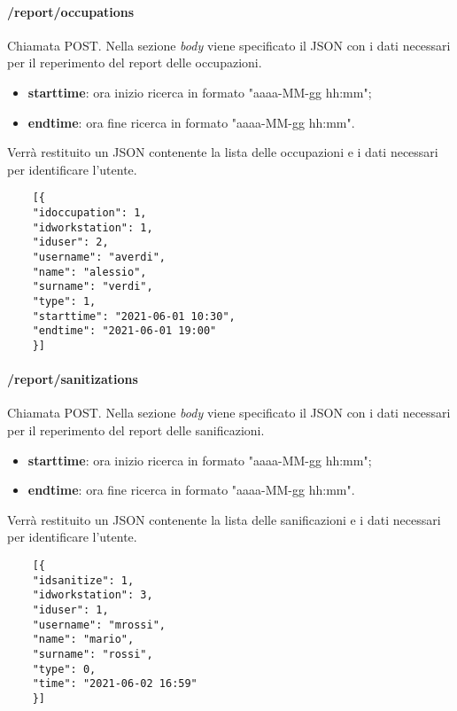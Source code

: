 \paragraph{/report/occupations}
Chiamata POST. Nella sezione \textit{body} viene specificato il JSON con i dati necessari per il reperimento del report delle occupazioni.
\begin{itemize}
	\item \textbf{starttime}: ora inizio ricerca in formato "aaaa-MM-gg hh:mm";
	\item \textbf{endtime}: ora fine ricerca in formato "aaaa-MM-gg hh:mm".
\end{itemize}
Verrà restituito un JSON contenente la lista delle occupazioni e i dati necessari per identificare l'utente.
\begin{center}
	\begin{lstlisting}
	[{
	"idoccupation": 1,
	"idworkstation": 1,
	"iduser": 2,
	"username": "averdi",
	"name": "alessio",
	"surname": "verdi",
	"type": 1,
	"starttime": "2021-06-01 10:30",
	"endtime": "2021-06-01 19:00"
	}]
	\end{lstlisting}
\end{center}
\paragraph{/report/sanitizations}
Chiamata POST. Nella sezione \textit{body} viene specificato il JSON con i dati necessari per il reperimento del report delle sanificazioni.
\begin{itemize}
	\item \textbf{starttime}: ora inizio ricerca in formato "aaaa-MM-gg hh:mm";
	\item \textbf{endtime}: ora fine ricerca in formato "aaaa-MM-gg hh:mm".
\end{itemize}
Verrà restituito un JSON contenente la lista delle sanificazioni e i dati necessari per identificare l'utente.
\begin{center}
	\begin{lstlisting}
	[{
	"idsanitize": 1,
	"idworkstation": 3,
	"iduser": 1,
	"username": "mrossi",
	"name": "mario",
	"surname": "rossi",
	"type": 0,
	"time": "2021-06-02 16:59"
	}]
	\end{lstlisting}
\end{center}
